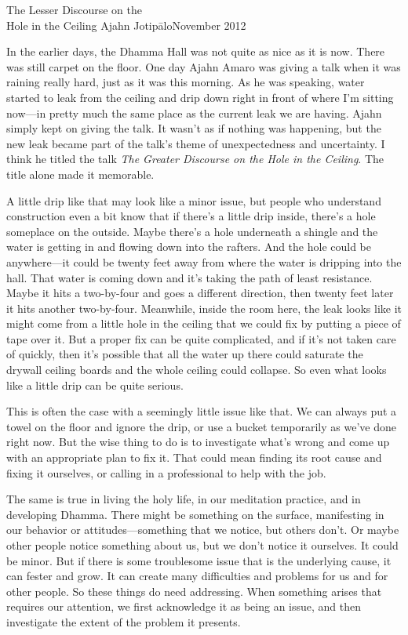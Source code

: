 {The Lesser Discourse on the\\Hole in the Ceiling}
{Ajahn Jotipālo}{November 2012}

In the earlier days, the Dhamma Hall was not quite as nice as it is 
now. There was still carpet on the floor. One day Ajahn Amaro was 
giving a talk when it was raining really hard, just as it was this 
morning. As he was speaking, water started to leak from the ceiling and 
drip down right in front of where I'm sitting now---in pretty much the 
same place as the current leak we are having. Ajahn simply kept on 
giving the talk. It wasn't as if nothing was happening, but the new 
leak became part of the talk's theme of unexpectedness and uncertainty. 
I think he titled the talk \emph{The Greater Discourse on the Hole in 
the Ceiling}. The title alone made it memorable.

A little drip like that may look like a minor issue, but people who 
understand construction even a bit know that if there's a little drip 
inside, there's a hole someplace on the outside. Maybe there's a hole 
underneath a shingle and the water is getting in and flowing down into 
the rafters. And the hole could be anywhere---it could be twenty feet 
away from where the water is dripping into the hall. That water is 
coming down and it's taking the path of least resistance. Maybe it hits 
a two-by-four and goes a different direction, then twenty feet later it 
hits another two-by-four. Meanwhile, inside the room here, the leak 
looks like it might come from a little hole in the ceiling that we 
could fix by putting a piece of tape over it. But a proper fix can be 
quite complicated, and if it's not taken care of quickly, then it's 
possible that all the water up there could saturate the drywall ceiling 
boards and the whole ceiling could collapse. So even what looks like a 
little drip can be quite serious.

This is often the case with a seemingly little issue like that. We can 
always put a towel on the floor and ignore the drip, or use a bucket 
temporarily as we've done right now. But the wise thing to do is to 
investigate what's wrong and come up with an appropriate plan to fix 
it. That could mean finding its root cause and fixing it ourselves, or 
calling in a professional to help with the job.

The same is true in living the holy life, in our meditation practice, 
and in developing Dhamma. There might be something on the surface, 
manifesting in our behavior or attitudes---something that we notice, 
but others don't. Or maybe other people notice something about us, but 
we don't notice it ourselves. It could be minor. But if there is some 
troublesome issue that is the underlying cause, it can fester and grow. 
It can create many difficulties and problems for us and for other 
people. So these things do need addressing. When something arises that 
requires our attention, we first acknowledge it as being an issue, and 
then investigate the extent of the problem it presents.

